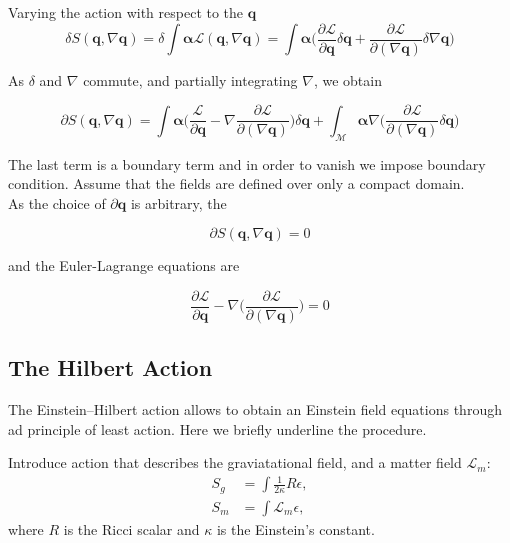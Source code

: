 \documentclass[11pt,a4paper,headinclude=true,DIV=14,BCOR=8mm,chapterprefix,listof=totoc,twoside,openright,abstracton]{scrbook}
\begin{document}
Varying the action with respect to the $\boldsymbol{q}$
\begin{equation}
    \delta S(\boldsymbol{q}, \nabla\boldsymbol{q}) = \delta\int\boldsymbol{\alpha}\mathcal{L}(\boldsymbol{q}, \nabla\boldsymbol{q}) = \int\boldsymbol{\alpha}\Big(\frac{\partial\mathcal{L}}{\partial\boldsymbol{q}}\delta\boldsymbol{q}+\frac{\partial\mathcal{L}}{\partial(\nabla\boldsymbol{q})}\delta\nabla\boldsymbol{q}\Big)
\end{equation}

As $\delta$ and $\nabla$ commute, and partially integrating $\nabla$, we obtain

\begin{equation}
    \partial S(\boldsymbol{q}, \nabla\boldsymbol{q}) = \int\boldsymbol{\alpha}\Big(\frac{\mathcal{L}}{\partial\boldsymbol{q}}-\nabla\frac{\partial \mathcal{L}}{\partial(\nabla\boldsymbol{q})}\Big)\delta\boldsymbol{q} + \int_{\mathcal{M}}\boldsymbol{\alpha}\nabla\Big(\frac{\partial\mathcal{L}}{\partial(\nabla\boldsymbol{q})}\delta\boldsymbol{q}\Big)
\end{equation}

The last term is a boundary term and in order to vanish we impose boundary condition. Assume that the fields are defined over only a compact domain. \\
As the choice of $\partial\boldsymbol{q}$ is arbitrary, the 

\begin{equation}
    \partial S(\boldsymbol{q}, \nabla\boldsymbol{q}) = 0
\end{equation}

and the Euler-Lagrange equations are

\begin{equation}
    \frac{\partial \mathcal{L}}{\partial\boldsymbol{q}} - \nabla\Big(\frac{\partial\mathcal{L}}{\partial(\nabla\boldsymbol{q})}\Big) = 0
    \label{eq:theory:eulerlagrange}
\end{equation}

\subsection{The Hilbert Action}

The Einstein–Hilbert action allows to obtain an Einstein field equations through ad principle of least action. Here we briefly underline the procedure.

Introduce action that describes the graviatational field, and a matter field $\mathcal{L}_m$:
\begin{align}
    S_g &= \int\frac{1}{2\kappa}R\epsilon, \\
    S_m &= \int\mathcal{L}_{m}\epsilon,
\end{align}
where $R$ is the Ricci scalar and $\kappa$ is the  Einstein's constant. \\
\end{document}
